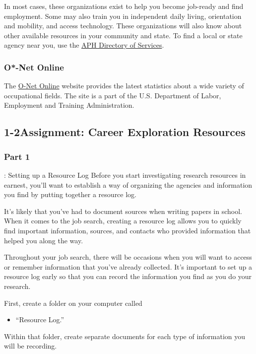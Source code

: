 In most cases, these organizations exist to help you become job-ready and find employment. Some may also train you in independent daily living, orientation and mobility, and access technology. These organizations will also know about other available resources in your community and state. To find a local or state agency near you, use the \href{https://aphcareerconnect.org/directory/about-the-aph-directory-of-services/}{APH Directory of Services}.
\subsubsection*{O*-Net Online}
The \href{https://www.onetonline.org/}{O-Net Online} website provides the latest statistics about a wide variety of occupational fields. The site is a part of the U.S. Department of Labor, Employment and Training Administration.

\pagebreak \subsection*{1-2\quad Assignment: Career Exploration Resources}
\subsubsection*{Part 1}: Setting up a Resource Log Before you start investigating research resources in earnest, you'll want to establish a way of organizing the agencies and information you find by putting together a resource log.

It's likely that you've had to document sources when writing papers in school. When it comes to the job search, creating a resource log allows you to quickly find important information, sources, and contacts who provided information that helped you along the way.

Throughout your job search, there will be occasions when you will want to access or remember information that you've already collected. It's important to set up a resource log early so that you can record the information you find as you do your research.

First, create a folder on your computer called
\begin{itemize}[leftmargin=1.0cm]
	\item ``Resource Log.''
\end{itemize}

Within that folder, create separate documents for each type of information you will be recording.

